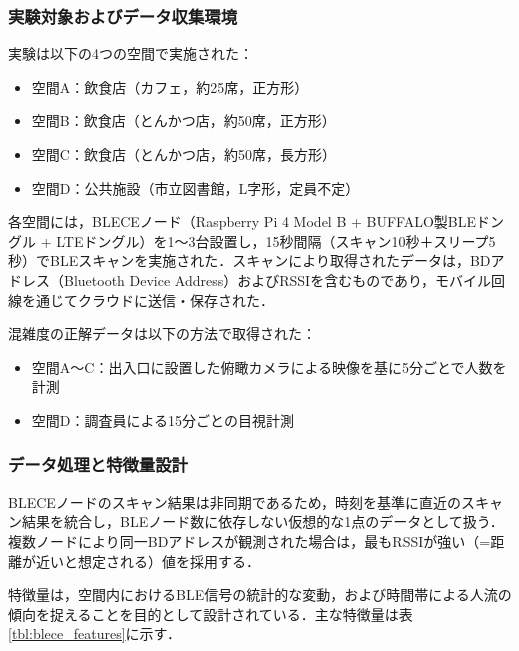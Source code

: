 \subsubsection*{実験対象およびデータ収集環境}

実験は以下の4つの空間で実施された：

\begin{itemize}
  \item 空間A：飲食店（カフェ，約25席，正方形）
  \item 空間B：飲食店（とんかつ店，約50席，正方形）
  \item 空間C：飲食店（とんかつ店，約50席，長方形）
  \item 空間D：公共施設（市立図書館，L字形，定員不定）
\end{itemize}

各空間には，BLECEノード（Raspberry Pi 4 Model B + BUFFALO製BLEドングル + LTEドングル）を1〜3台設置し，15秒間隔（スキャン10秒＋スリープ5秒）でBLEスキャンを実施された．スキャンにより取得されたデータは，BDアドレス（Bluetooth Device Address）およびRSSIを含むものであり，モバイル回線を通じてクラウドに送信・保存された．

混雑度の正解データは以下の方法で取得された：

\begin{itemize}
  \item 空間A〜C：出入口に設置した俯瞰カメラによる映像を基に5分ごとで人数を計測
  \item 空間D：調査員による15分ごとの目視計測
\end{itemize}

\subsubsection*{データ処理と特徴量設計}

BLECEノードのスキャン結果は非同期であるため，時刻を基準に直近のスキャン結果を統合し，BLEノード数に依存しない仮想的な1点のデータとして扱う．複数ノードにより同一BDアドレスが観測された場合は，最もRSSIが強い（=距離が近いと想定される）値を採用する．

特徴量は，空間内におけるBLE信号の統計的な変動，および時間帯による人流の傾向を捉えることを目的として設計されている．主な特徴量は表\ref{tbl:blece_features}に示す．

